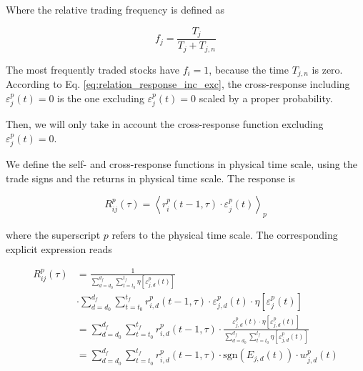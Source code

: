 Where the relative trading frequency is defined as \cite{Wang_2016_avg}

\begin{equation}\label{eq:response_trading_frequency}
    f_{j}=\frac{T_{j}}{T_{j}+T_{j,n}}
\end{equation}

The most frequently traded stocks have $f_{i} = 1$, because the time $T_{j,n}$
is zero. According to Eq. \ref{eq:relation_response_inc_exc}, the
cross-response including $\varepsilon^{p}_j \left( t\right) = 0$ is the one
excluding $\varepsilon^{p}_j \left( t\right) = 0$ scaled by a proper
probability.

Then, we will only take in account the cross-response function excluding
$\varepsilon^{p}_j \left( t\right) = 0$.

We define the self- and cross-response functions in physical time scale, using
the trade signs and the returns in physical time scale. The response is

\begin{equation}\label{eq:response_functions_time_scale_general}
    R^{p}_{ij}\left(\tau\right)=\left\langle r^{p}_{i}\left(t-1, \tau\right)
    \cdot\varepsilon_{j}^{p} \left(t\right)
    \right\rangle _{p}
\end{equation}

where the superscript $p$ refers to the physical time scale. The corresponding
explicit expression reads

\begin{align}\label{eq:response_seconds_explicit}
    R_{ij}^{p}\left(\tau\right)&=\frac{1}{\sum_{d=d_{0}}^{d_{f}}
    \sum_{t=t_{0}}^{t_{f}} \eta\left[ \varepsilon_{j,d}^{p}
    \left(t\right)\right]} \nonumber \\
    &\cdot\sum_{d=d_{0}}^{d_{f}} \sum_{t=t_{0}}^{t_{f}}
    r^{p}_{i,d}\left(t-1,\tau\right) \cdot\varepsilon_{j,d}^{p}\left(t\right)
    \cdot\eta\left[\varepsilon_{j}^{p} \left(t\right)\right] \\
    &=\sum_{d=d_{0}}^{d_{f}}\sum_{t=t_{0}}^{t_{f}}r^{p}_{i,d}
    \left(t-1,\tau\right) \cdot\frac{\varepsilon_{j,d}^{p}\left(t\right)
    \cdot\eta\left[\varepsilon_{j,d}^{p} \left( t\right)\right]}
    {\sum_{d=d_{0}}^{d_{f}}\sum_{t=t_{0}}^{t_{f}}\eta
    \left[\varepsilon_{j,d}^{p} \left(t\right)\right]} \nonumber \\
    &=\sum_{d=d_{0}}^{d_{f}}\sum_{t=t_{0}}^{t_{f}}r^{p}_{i,d}
    \left(t-1,\tau\right) \cdot\text{sgn}\left(E_{j,d}\left(t\right)\right)
    \cdot w_{j,d}^{p}\left(t\right)
\end{align}

